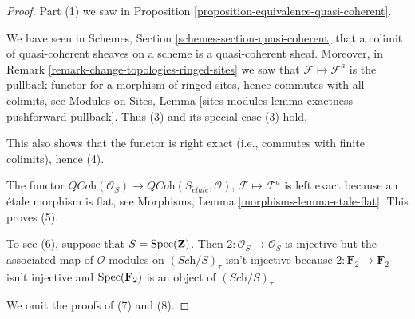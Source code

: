 \begin{proof}
Part (1) we saw in
Proposition \ref{proposition-equivalence-quasi-coherent}.

\medskip\noindent
We have seen in
Schemes, Section \ref{schemes-section-quasi-coherent}
that a colimit of quasi-coherent sheaves on a scheme is a quasi-coherent
sheaf. Moreover, in
Remark \ref{remark-change-topologies-ringed-sites}
we saw that $\mathcal{F} \mapsto \mathcal{F}^a$ is the pullback functor
for a morphism of ringed sites, hence commutes with all colimits, see
Modules on Sites, Lemma
\ref{sites-modules-lemma-exactness-pushforward-pullback}.
Thus (3) and its special case (3) hold.

\medskip\noindent
This also shows that the functor is right exact (i.e., commutes with
finite colimits), hence (4).

\medskip\noindent
The functor $\textit{QCoh}(\mathcal{O}_S) \to
\textit{QCoh}(S_{\acute{e}tale}, \mathcal{O})$,
$\mathcal{F} \mapsto \mathcal{F}^a$
is left exact because an \'etale morphism is flat, see
Morphisms, Lemma \ref{morphisms-lemma-etale-flat}.
This proves (5).

\medskip\noindent
To see (6), suppose that $S = \mathop{\rm Spec}(\mathbf{Z})$.
Then $2 : \mathcal{O}_S \to \mathcal{O}_S$ is injective but the associated
map of $\mathcal{O}$-modules on $(\textit{Sch}/S)_\tau$ isn't
injective because $2 : \mathbf{F}_2 \to \mathbf{F}_2$ isn't injective
and $\mathop{\rm Spec}(\mathbf{F}_2)$ is an object of $(\textit{Sch}/S)_\tau$.

\medskip\noindent
We omit the proofs of (7) and (8).


\end{proof}
